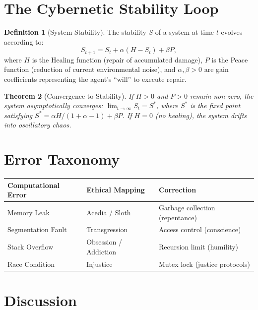 \documentclass[12pt, a4paper]{article}
\theoremstyle{plain}
\newtheorem{theorem}{Theorem}[section]
\theoremstyle{definition}
\newtheorem{definition}[theorem]{Definition}
\theoremstyle{remark}
\begin{document}
\section{The Cybernetic Stability Loop}\label{sec:cybernetic}

\begin{definition}[System Stability]\label{def:stability}
  The stability $S$ of a system at time $t$ evolves according to:
  \begin{equation}\label{eq:stability}
    S_{t+1} = S_t + \alpha(H - S_t) + \beta P,
  \end{equation}
  where $H$ is the Healing function (repair of accumulated damage),
  $P$ is the Peace function (reduction of current environmental noise),
  and $\alpha, \beta > 0$ are gain coefficients representing the agent's
  ``will'' to execute repair.
\end{definition}

\begin{theorem}[Convergence to Stability]\label{thm:convergence}
  If $H > 0$ and $P > 0$ remain non-zero, the system asymptotically
  converges: $\lim_{t \to \infty} S_t = S^*$, where $S^*$ is the fixed
  point satisfying $S^* = \alpha H / (1 + \alpha - 1) + \beta P$.
  If $H = 0$ (no healing), the system drifts into oscillatory chaos.
\end{theorem}

\section{Error Taxonomy}\label{sec:errors}

\begin{center}
\begin{tabular}{lll}
  \toprule
  \textbf{Computational Error} & \textbf{Ethical Mapping} & \textbf{Correction} \\
  \midrule
  Memory Leak & Acedia / Sloth & Garbage collection (repentance) \\
  Segmentation Fault & Transgression & Access control (conscience) \\
  Stack Overflow & Obsession / Addiction & Recursion limit (humility) \\
  Race Condition & Injustice & Mutex lock (justice protocols) \\
  \bottomrule
\end{tabular}
\end{center}

\section{Discussion}\label{sec:discussion}
\end{document}

